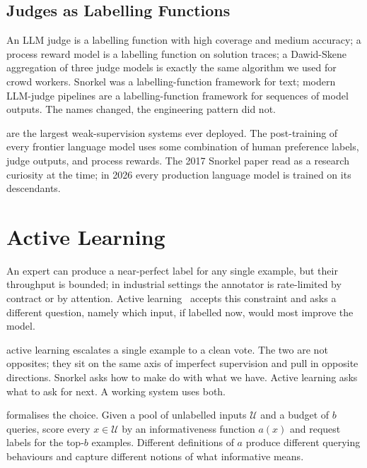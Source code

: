 \subsection{Judges as Labelling Functions}

 An LLM judge is a labelling function with high coverage and medium accuracy; a process reward model is a labelling function on solution traces; a Dawid-Skene aggregation of three judge models is exactly the same algorithm we used for crowd workers. Snorkel was a labelling-function framework for text; modern LLM-judge pipelines are a labelling-function framework for sequences of model outputs. The names changed, the engineering pattern did not.

 are the largest weak-supervision systems ever deployed. The post-training of every frontier language model uses some combination of human preference labels, judge outputs, and process rewards. The 2017 Snorkel paper read as a research curiosity at the time; in 2026 every production language model is trained on its descendants.


\newpage
\section{Active Learning}


 An expert can produce a near-perfect label for any single example, but their throughput is bounded; in industrial settings the annotator is rate-limited by contract or by attention. Active learning~\cite{Settles2012ActiveLearning} accepts this constraint and asks a different question, namely which input, if labelled now, would most improve the model.

 active learning escalates a single example to a clean vote. The two are not opposites; they sit on the same axis of imperfect supervision and pull in opposite directions. Snorkel asks how to make do with what we have. Active learning asks what to ask for next. A working system uses both.

 formalises the choice. Given a pool of unlabelled inputs $\mathcal{U}$ and a budget of $b$ queries, score every $x \in \mathcal{U}$ by an informativeness function $a(x)$ and request labels for the top-$b$ examples. Different definitions of $a$ produce different querying behaviours and capture different notions of what informative means.

